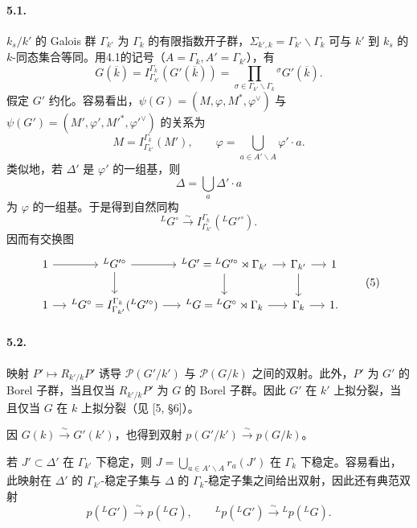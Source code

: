 \paragraph*{5.1.} $k_s/k'$ 的 Galois 群 $\Gamma_{k'}$ 为 $\Gamma_k$ 的有限指数开子群，$\Sigma_{k',k}=\Gamma_{k'}\backslash\Gamma_k$ 可与 $k'$ 到 $k_s$ 的 $k$-同态集合等同。用4.1的记号（$A=\Gamma_k,A'=\Gamma_{k'}$），有
\begin{equation}
 G(\overline k)=I_{\Gamma_{k'}}^{\Gamma_k}(G'(\overline k))
 =\prod_{\sigma\in\Gamma_{k'}\backslash\Gamma_k}{}^\sigma G'(\overline k).\tag{1}
\end{equation}
假定 $G'$ 约化。容易看出，$\psi(G)=(M,\varphi,M^*,\varphi^\vee)$ 与 $\psi(G')=(M',\varphi',M'^*,\varphi'^\vee)$ 的关系为
\begin{equation}
 M=I_{\Gamma_{k'}}^{\Gamma_k}(M'),\qquad
 \varphi=\bigcup_{a\in A'\backslash A}\varphi'\cdot a.\tag{2}
\end{equation}
类似地，若 $\Delta'$ 是 $\varphi'$ 的一组基，则
\begin{equation}
 \Delta=\bigcup_a\Delta'\cdot a\tag{3}
\end{equation}
为 $\varphi$ 的一组基。于是得到自然同构
\begin{equation}
 {}^LG^\circ\xrightarrow{\sim}I_{\Gamma_{k'}}^{\Gamma_k}({}^LG'^\circ).\tag{4}
\end{equation}
因而有交换图
\begin{equation}
\begin{tikzcd}[column sep=small]
 1\arrow[r]&{}^LG'^\circ\arrow[r]\arrow[d]&{}^LG'={}^LG'^\circ\rtimes\Gamma_{k'}\arrow[r]\arrow[d]&\Gamma_{k'}\arrow[r]\arrow[d]&1\\
 1\arrow[r]&{}^LG^\circ=I_{\Gamma_{k'}}^{\Gamma_k}({}^LG'^\circ)\arrow[r]&{}^LG={}^LG^\circ\rtimes\Gamma_k\arrow[r]&\Gamma_k\arrow[r]&1.
\end{tikzcd}\tag{5}
\end{equation}

\paragraph*{5.2.} 映射 $P'\mapsto R_{k'/k}P'$ 诱导 $\mathcal P(G'/k')$ 与 $\mathcal P(G/k)$ 之间的双射。此外，$P'$ 为 $G'$ 的 Borel 子群，当且仅当 $R_{k'/k}P'$ 为 $G$ 的 Borel 子群。因此 $G'$ 在 $k'$ 上拟分裂，当且仅当 $G$ 在 $k$ 上拟分裂（见 [5, §6]）。

因 $G(k)\xrightarrow{\sim}G'(k')$，也得到双射 $p(G'/k')\xrightarrow{\sim}p(G/k)$。

若 $J'\subset\Delta'$ 在 $\Gamma_{k'}$ 下稳定，则 $J=\bigcup_{a\in A'\backslash A}r_a(J')$ 在 $\Gamma_k$ 下稳定。容易看出，此映射在 $\Delta'$ 的 $\Gamma_{k'}$-稳定子集与 $\Delta$ 的 $\Gamma_k$-稳定子集之间给出双射，因此还有典范双射
\[
 p({}^LG')\xrightarrow{\sim}p({}^LG),\qquad
 {}^Lp({}^LG')\xrightarrow{\sim}{}^Lp({}^LG).
\]

